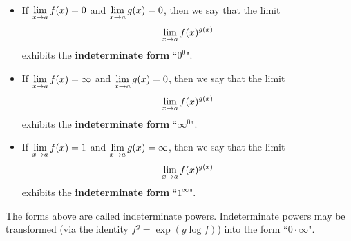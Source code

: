 \newpage

\begin{definition}\,
\begin{itemize}
\item If $\displaystyle\lim_{x\to a}f(x) = 0$ and $\displaystyle\lim_{x\to a}g(x) = 0$, then we say that the limit $$\displaystyle\lim_{x\to a}f(x)^{g(x)}$$ exhibits the \textbf{indeterminate form} ``$0^0$".
\item If $\displaystyle\lim_{x\to a}f(x) = \infty$ and $\displaystyle\lim_{x\to a}g(x) = 0$, then we say that the limit $$\displaystyle\lim_{x\to a}f(x)^{g(x)}$$ exhibits the \textbf{indeterminate form} ``$\infty^0$".
\item If $\displaystyle\lim_{x\to a}f(x) = 1$ and $\displaystyle\lim_{x\to a}g(x) = \infty$, then we say that the limit $$\displaystyle\lim_{x\to a}f(x)^{g(x)}$$ exhibits the \textbf{indeterminate form} ``$1^{\infty}$".
\end{itemize}
\end{definition}

\begin{remark}
The forms above are called indeterminate powers.
Indeterminate powers may be transformed (via the identity $f^g = \exp(g\log f)$) into the form ``$0\cdot \infty$".
\end{remark}

